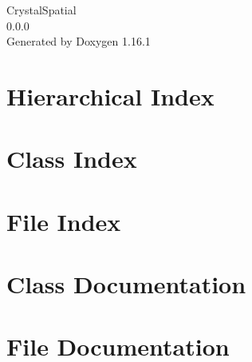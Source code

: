 \documentclass[twoside]{book}
\newcommand{\+}{\discretionary{\mbox{\scriptsize$\hookleftarrow$}}{}{}}
\newcommand{\clearemptydoublepage}{%
    \newpage{\pagestyle{empty}\cleardoublepage}%
  }
\begin{document}
  \raggedbottom
    \hypersetup{pageanchor=false,
                bookmarksnumbered=true,
                pdfencoding=unicode
               }
  \begin{titlepage}
  \vspace*{7cm}
  \begin{center}%
  {\Large Crystal\+Spatial}\\
  [1ex]\large 0.\+0.\+0 \\
  \vspace*{1cm}
  {\large Generated by Doxygen 1.16.1}\\
  \end{center}
  \end{titlepage}
  \clearemptydoublepage
  \tableofcontents
  \clearemptydoublepage
  \hypersetup{pageanchor=true}


\chapter{Hierarchical Index}

\chapter{Class Index}

\chapter{File Index}

\chapter{Class Documentation}



\chapter{File Documentation}









  \backmatter
  \newpage
  \clearemptydoublepage
  \printindex
\end{document}
